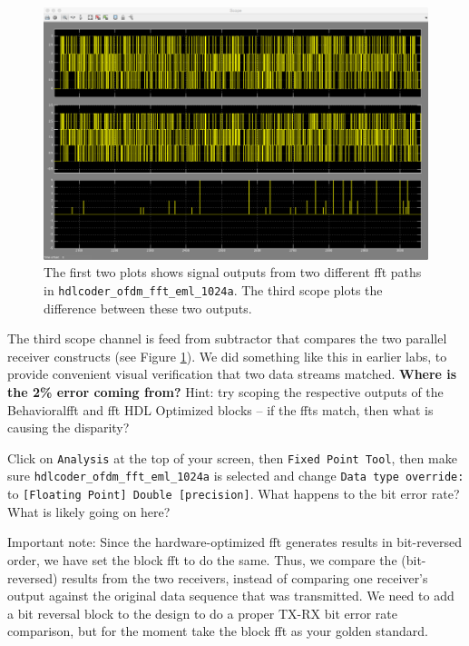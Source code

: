 \begin{figure}
\centering
\includegraphics[width=5.5in]{images/ofdm_1024a_scope}
\caption{The first two plots shows signal outputs from two different \gls{fft} paths in \texttt{hdlcoder\_ofdm\_fft\_eml\_1024a}. The third scope plots the difference between these two outputs.}
\label{fig:ofdm_1024a_scope}
\end{figure}
 
The third scope channel is feed from subtractor that compares the two parallel receiver constructs (see Figure \ref{fig:ofdm_1024a_scope}). We did something like this in earlier labs, to provide convenient visual verification that two data streams matched. \textbf{Where is the 2\% error coming from?} Hint: try scoping the respective outputs of the Behavioral\gls{fft} and \gls{fft} HDL Optimized blocks -- if the \gls{fft}s match, then what is causing the disparity?
 
Click on \texttt{Analysis} at the top of your screen, then \texttt{Fixed Point Tool}, then make sure \texttt{hdlcoder\_ofdm\_fft\_eml\_1024a} is selected and change \texttt{Data type override:} to \texttt{[Floating Point] Double [precision]}. What happens to the bit error rate? What is likely going on here?

Important note: Since the hardware-optimized \gls{fft} generates results in bit-reversed order, we have set the block \gls{fft} to do the same. Thus, we compare the (bit-reversed) results from the two receivers, instead of comparing one receiver's output against the original data sequence that was transmitted. We need to add a bit reversal block to the design to do a proper TX-RX bit error rate comparison, but for the moment take the block \gls{fft} as your golden standard.
 
